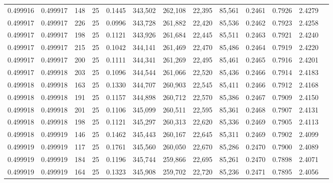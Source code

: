 \begin{tabular}{rrrrrrrrrrrrr}
0.499916 & 0.499917 &   148 &  25 &                                     0.1445 & 343,502 & 262,108 &  22,395 &  85,561 & 0.2461 & 0.7926 & 2.4279 \\
0.499917 & 0.499917 &   226 &  25 &                                     0.0996 & 343,728 & 261,882 &  22,420 &  85,536 & 0.2462 & 0.7923 & 2.4258 \\
0.499917 & 0.499917 &   198 &  25 &                                     0.1121 & 343,926 & 261,684 &  22,445 &  85,511 & 0.2463 & 0.7921 & 2.4240 \\
0.499917 & 0.499917 &   215 &  25 &                                     0.1042 & 344,141 & 261,469 &  22,470 &  85,486 & 0.2464 & 0.7919 & 2.4220 \\
0.499917 & 0.499917 &   200 &  25 &                                     0.1111 & 344,341 & 261,269 &  22,495 &  85,461 & 0.2465 & 0.7916 & 2.4201 \\
0.499917 & 0.499918 &   203 &  25 &                                     0.1096 & 344,544 & 261,066 &  22,520 &  85,436 & 0.2466 & 0.7914 & 2.4183 \\
0.499918 & 0.499918 &   163 &  25 &                                     0.1330 & 344,707 & 260,903 &  22,545 &  85,411 & 0.2466 & 0.7912 & 2.4168 \\
0.499918 & 0.499918 &   191 &  25 &                                     0.1157 & 344,898 & 260,712 &  22,570 &  85,386 & 0.2467 & 0.7909 & 2.4150 \\
0.499918 & 0.499918 &   201 &  25 &                                     0.1106 & 345,099 & 260,511 &  22,595 &  85,361 & 0.2468 & 0.7907 & 2.4131 \\
0.499918 & 0.499918 &   198 &  25 &                                     0.1121 & 345,297 & 260,313 &  22,620 &  85,336 & 0.2469 & 0.7905 & 2.4113 \\
0.499918 & 0.499919 &   146 &  25 &                                     0.1462 & 345,443 & 260,167 &  22,645 &  85,311 & 0.2469 & 0.7902 & 2.4099 \\
0.499919 & 0.499919 &   117 &  25 &                                     0.1761 & 345,560 & 260,050 &  22,670 &  85,286 & 0.2470 & 0.7900 & 2.4089 \\
0.499919 & 0.499919 &   184 &  25 &                                     0.1196 & 345,744 & 259,866 &  22,695 &  85,261 & 0.2470 & 0.7898 & 2.4071 \\
0.499919 & 0.499919 &   164 &  25 &                                     0.1323 & 345,908 & 259,702 &  22,720 &  85,236 & 0.2471 & 0.7895 & 2.4056 \\

\end{tabular}
